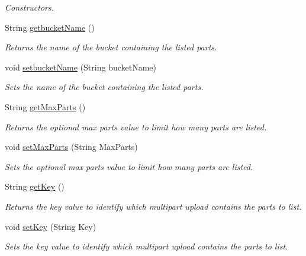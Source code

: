 \begin{DoxyCompactItemize}
\begin{DoxyCompactList}\small\item\em Constructors. \end{DoxyCompactList}\item 
String \hyperlink{classorg_1_1jcs_1_1dss_1_1main_1_1PartListing_a5c345e75fdea1da32409866878833074}{getbucket\+Name} ()
\begin{DoxyCompactList}\small\item\em Returns the name of the bucket containing the listed parts. \end{DoxyCompactList}\item 
void \hyperlink{classorg_1_1jcs_1_1dss_1_1main_1_1PartListing_a641ff7ed180604be01df10c3de20fb10}{setbucket\+Name} (String bucket\+Name)
\begin{DoxyCompactList}\small\item\em Sets the name of the bucket containing the listed parts. \end{DoxyCompactList}\item 
String \hyperlink{classorg_1_1jcs_1_1dss_1_1main_1_1PartListing_a9c6b7bbb2b5a8e4a18926492e7f07fd4}{get\+Max\+Parts} ()
\begin{DoxyCompactList}\small\item\em Returns the optional max parts value to limit how many parts are listed. \end{DoxyCompactList}\item 
void \hyperlink{classorg_1_1jcs_1_1dss_1_1main_1_1PartListing_a0e85d85be88382ae12536041ce511f38}{set\+Max\+Parts} (String Max\+Parts)
\begin{DoxyCompactList}\small\item\em Sets the optional max parts value to limit how many parts are listed. \end{DoxyCompactList}\item 
String \hyperlink{classorg_1_1jcs_1_1dss_1_1main_1_1PartListing_adbaa6b2d47e7c9c1e972ea920c1a557f}{get\+Key} ()
\begin{DoxyCompactList}\small\item\em Returns the key value to identify which multipart upload contains the parts to list. \end{DoxyCompactList}\item 
void \hyperlink{classorg_1_1jcs_1_1dss_1_1main_1_1PartListing_aac6885e9c78346c204d9f875a0aa2d00}{set\+Key} (String Key)
\begin{DoxyCompactList}\small\item\em Sets the key value to identify which multipart upload contains the parts to list. \end{DoxyCompactList}\item 

\end{DoxyCompactItemize}
